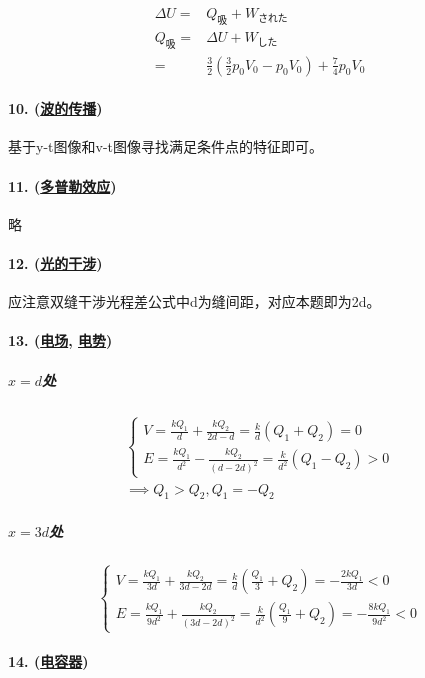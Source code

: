 \begin{align*}
    \Delta U=&Q_\textrm{吸}+W_\textrm{された}\\
    Q_\textrm{吸}=&\Delta U+W_\textrm{した}\\
    =&\frac32\left(\frac32p_0V_0-p_0V_0\right)+\frac74p_0V_0
\end{align*}

\paragraph{10. (\hyperref[subsec:波的传播]{波的传播})} 基于y-t图像和v-t图像寻找满足条件点的特征即可。
\paragraph{11. (\hyperref[subsec:多普勒效应]{多普勒效应})} 略
\paragraph{12. (\hyperref[subsec:光的干涉]{光的干涉})} 应注意双缝干涉光程差公式中d为缝间距，对应本题即为2d。
\paragraph{13. (\hyperref[subsec:电场]{电场}, \hyperref[subsec:电势]{电势})}

\subparagraph{$x=d$处}

\begin{gather*}
    \begin{cases}
        V=\frac{kQ_1}{d}+\frac{kQ_2}{2d-d}=\frac{k}{d}(Q_1+Q_2)=0\\
        E=\frac{kQ_1}{d^2}-\frac{kQ_2}{(d-2d)^2}=\frac{k}{d^2}(Q_1-Q_2)>0
    \end{cases}\\\implies
    Q_1>Q_2,Q_1=-Q_2
\end{gather*}

\subparagraph{$x=3d$处}

\begin{equation*}
    \begin{cases}
        V=\frac{kQ_1}{3d}+\frac{kQ_2}{3d-2d}=\frac{k}{d}(\frac{Q_1}{3}+Q_2)=-\frac{2kQ_1}{3d}<0\\
        E=\frac{kQ_1}{9d^2}+\frac{kQ_2}{(3d-2d)^2}=\frac{k}{d^2}(\frac{Q_1}{9}+Q_2)=-\frac{8kQ_1}{9d^2}<0
    \end{cases}
\end{equation*}

\paragraph{14. (\hyperref[subsec:电容器]{电容器})}

